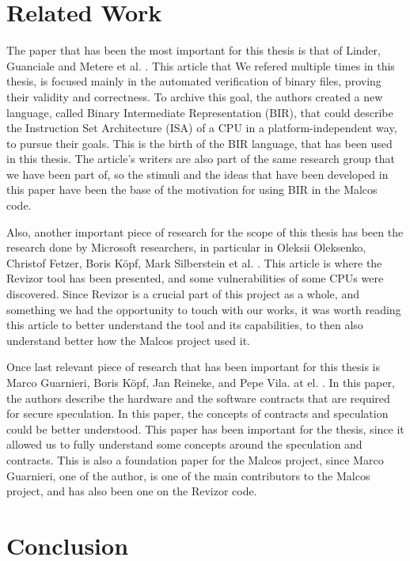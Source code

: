 \chapter{Related Work}
\label{cha:related_work}The paper that has been the most important for this
thesis is that of Linder, Guanciale and Metere et al. \cite{bir_pub}. This article
that We refered multiple times in this thesis, is focused mainly in the
automated verification of binary files, proving their validity and correctness.
To archive this goal, the authors created a new language, called Binary
Intermediate Representation (BIR), that could describe the Instruction Set Architecture
(ISA) of a CPU in a platform-independent way, to pursue their goals. This is the
birth of the BIR language, that has been used in this thesis. The article's writers
are also part of the same research group that we have been part of, so the
stimuli and the ideas that have been developed in this paper have been the base
of the motivation for using BIR in the Malcos code.

Also, another important piece of research for the scope of this thesis has been the
research done by Microsoft researchers, in particular in Oleksii Oleksenko, Christof
Fetzer, Boris Köpf, Mark Silberstein et al. \cite{article}. This article is where
the Revizor tool has been presented, and some vulnerabilities of some CPUs were
discovered. Since Revizor is a crucial part of this project as a whole, and
something we had the opportunity to touch with our works, it was worth reading this
article to better understand the tool and its capabilities, to then also
understand better how the Malcos project used it.

Once last relevant piece of research that has been important for this thesis is
Marco Guarnieri, Boris Köpf, Jan Reineke, and Pepe Vila. at el. \cite{contracts_paper}.
In this paper, the authors describe the hardware and the software contracts that
are required for secure speculation. In this paper, the concepts of contracts and
speculation could be better understood. This paper has been important for the
thesis, since it allowed us to fully understand some concepts around the speculation
and contracts. This is also a foundation paper for the Malcos project, since Marco
Guarnieri, one of the author, is one of the main contributors to the Malcos project,
and has also been one on the Revizor code.

\chapter{Conclusion}
\label{cha:conclusion}
